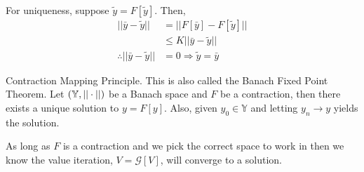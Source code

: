 For uniqueness, suppose $\tilde{y}=F[\tilde{y}]$. Then,
\begin{align*}
||\bar{y}-\tilde{y}|| &= ||F[\bar{y}]-F[\tilde{y}]|| \\
&\leq K||\bar{y}-\tilde{y}|| \\
\therefore ||\bar{y}-\tilde{y}|| &= 0 \Rightarrow \tilde{y} = \bar{y}
\end{align*}

\begin{theorem}{Contraction Mapping Principle.}
This is also called the Banach Fixed Point Theorem. Let $(\mathbb{Y},||\cdot||)$ be a Banach space and $F$ be a contraction, then there exists a unique solution to $y=F[y]$. Also, given $y_0\in\mathbb{Y}$ and letting $y_n\to y$ yields the solution.
\end{theorem}

As long as $F$ is a contraction and we pick the correct space to work in then we know the value iteration, $V=\mathcal{G}[V]$, will converge to a solution.


% 


